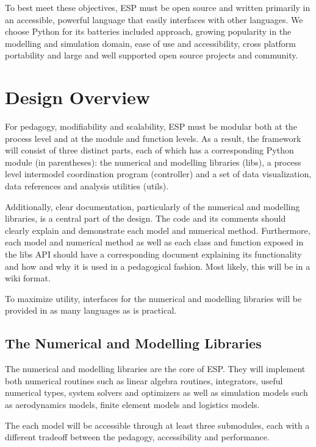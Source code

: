 \documentclass{book}
\begin{document}
To best meet these objectives, ESP must be open source and written primarily in an accessible, powerful language that easily interfaces with other languages. We choose Python for its batteries included approach, growing popularity in the modelling and simulation domain, ease of use and accessibility, cross platform portability and large and well supported open source projects and community.

\section{Design Overview}

For pedagogy, modifiability and scalability, ESP must be modular both at the process level and at the module and function levels. As a result, the framework will consist of three distinct parts, each of which has a corresponding Python module (in parentheses): the numerical and modelling libraries (libs), a process level intermodel  coordination program (controller) and a set of data visualization, data references and analysis utilities (utils). 

Additionally, clear documentation, particularly of the numerical and modelling libraries, is a central part of the design. The code and its comments should clearly explain and demonstrate each model and numerical method. Furthermore, each model and numerical method as well as each class and function exposed in the libs API should have a corresponding document explaining its functionality and how and why it is used in a pedagogical fashion. Most likely, this will be in a wiki format.

To maximize utility, interfaces for the numerical and modelling libraries will be provided in as many languages as is practical.

\subsection{The Numerical and Modelling Libraries}

The numerical and modelling libraries are the core of ESP. They will implement both numerical routines such as linear algebra routines, integrators, useful numerical types, system solvers and optimizers as well as simulation models such as aerodynamics models, finite element models and logistics models.

The each model will be accessible through at least three submodules, each with a different tradeoff between the pedagogy, accessibility and performance.
\end{document}
